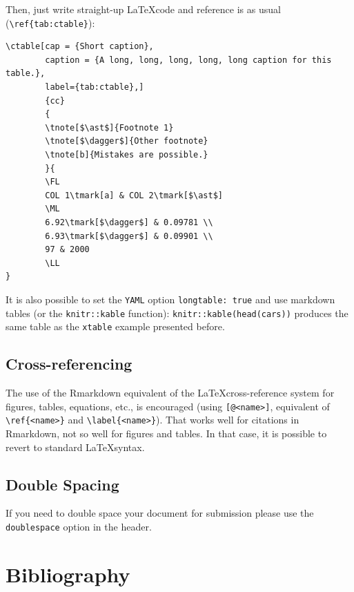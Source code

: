 \documentclass[AMA,STIX1COL,]{WileyNJD-v2}
\begin{document}
Then, just write straight-up \LaTeX code and reference is as usual
(\texttt{\textbackslash{}ref\{tab:ctable\}}):

\begin{verbatim}
\ctable[cap = {Short caption},
        caption = {A long, long, long, long, long caption for this table.},
        label={tab:ctable},]
        {cc}
        {
        \tnote[$\ast$]{Footnote 1}
        \tnote[$\dagger$]{Other footnote}
        \tnote[b]{Mistakes are possible.}
        }{
        \FL
        COL 1\tmark[a] & COL 2\tmark[$\ast$]
        \ML
        6.92\tmark[$\dagger$] & 0.09781 \\
        6.93\tmark[$\dagger$] & 0.09901 \\
        97 & 2000
        \LL
}
\end{verbatim}

It is also possible to set the \texttt{YAML} option
\texttt{longtable:\ true} and use markdown tables (or the
\texttt{knitr::kable} function): \texttt{knitr::kable(head(cars))}
produces the same table as the \texttt{xtable} example presented before.

\hypertarget{cross-referencing}{%
\subsection{Cross-referencing}\label{cross-referencing}}

The use of the Rmarkdown equivalent of the \LaTeX cross-reference system
for figures, tables, equations, etc., is encouraged (using
\texttt{{[}@\textless{}name\textgreater{}{]}}, equivalent of
\texttt{\textbackslash{}ref\{\textless{}name\textgreater{}\}} and
\texttt{\textbackslash{}label\{\textless{}name\textgreater{}\}}). That
works well for citations in Rmarkdown, not so well for figures and
tables. In that case, it is possible to revert to standard
\LaTeX syntax.

\hypertarget{double-spacing}{%
\subsection{Double Spacing}\label{double-spacing}}

If you need to double space your document for submission please use the
\texttt{doublespace} option in the header.

\hypertarget{bibliography}{%
\section{Bibliography}\label{bibliography}}
\end{document}
